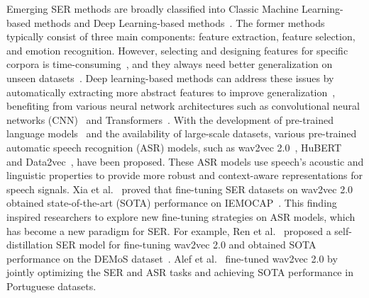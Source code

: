 \documentclass{article}
\begin{document}
Emerging SER methods are broadly classified into Classic Machine Learning-based methods and Deep Learning-based methods~\cite{abbaschian2021deep}. The former methods~\cite{GharsellaouiSY19, Paraskevopoulos19,DBLP:conf/mir/WangLFO23} typically consist of three main components: feature extraction, feature selection, and emotion recognition. However, selecting and designing features for specific corpora is time-consuming~\cite{AyadiKK11}, and they always need better generalization on unseen datasets~\cite{PadiSSM21}. Deep learning-based methods can address these issues by automatically extracting more abstract features to improve generalization~\cite{LeCunBH15,DBLP:conf/icassp/MoraisHZGDA22,DBLP:journals/corr/abs-2307-10757}, benefiting from various neural network architectures such as convolutional neural networks (CNN)~\cite{Aftab} and Transformers~\cite{GhrissYRSW22}.
%
With the development of pre-trained language models~\cite{kenton2019bert} and the availability of large-scale datasets, various pre-trained automatic speech recognition (ASR) models, such as wav2vec 2.0~\cite{baevski2020wav2vec}, HuBERT~\cite{babu2021xls} and Data2vec~\cite{baevski2022data2vec}, have been proposed. These ASR models use speech's acoustic and linguistic properties to provide more robust and context-aware representations for speech signals. Xia et al.~\cite{XiaCRS21} proved that fine-tuning SER datasets on wav2vec 2.0~\cite{SchneiderBCA19} obtained state-of-the-art (SOTA) performance on IEMOCAP~\cite{BussoBLKMKCLN08}. This finding inspired researchers to explore new fine-tuning strategies on ASR models, which has become a new paradigm for SER. 
For example,
%
Ren et al.~\cite{abs-2210-14636} proposed a self-distillation SER model for fine-tuning wav2vec 2.0 and obtained SOTA performance on the DEMoS dataset~\cite{Cabaleiro20}.
%
Alef et al.~\cite{2207-14418} fine-tuned wav2vec 2.0 by jointly optimizing the SER and ASR tasks and achieving SOTA performance in Portuguese datasets.
\end{document}
